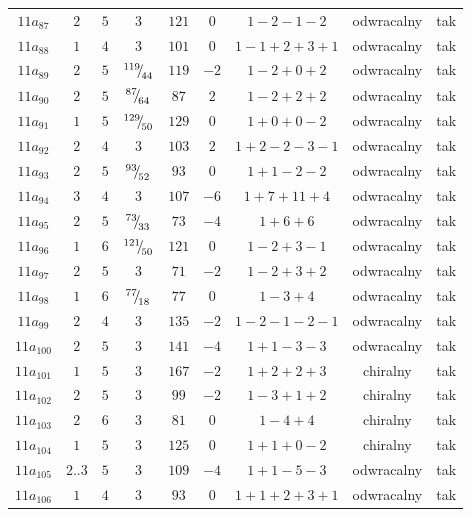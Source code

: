 \begin{longtable}{ccccccccc}
$11a_{87}$ & $2$ & $5$ & $3$ & $121$ & $0$ & $1-2-1-2$ & odwracalny & tak \\
$11a_{88}$ & $1$ & $4$ & $3$ & $101$ & $0$ & $1-1+2+3+1$ & odwracalny & tak \\
$11a_{89}$ & $2$ & $5$ & ${}^{119}{\mskip -5mu/\mskip -3mu}_{44}$ & $119$ & $-2$ & $1-2+0+2$ & odwracalny & tak \\
$11a_{90}$ & $2$ & $5$ & ${}^{87}{\mskip -5mu/\mskip -3mu}_{64}$ & $87$ & $2$ & $1-2+2+2$ & odwracalny & tak \\
$11a_{91}$ & $1$ & $5$ & ${}^{129}{\mskip -5mu/\mskip -3mu}_{50}$ & $129$ & $0$ & $1+0+0-2$ & odwracalny & tak \\
$11a_{92}$ & $2$ & $4$ & $3$ & $103$ & $2$ & $1+2-2-3-1$ & odwracalny & tak \\
$11a_{93}$ & $2$ & $5$ & ${}^{93}{\mskip -5mu/\mskip -3mu}_{52}$ & $93$ & $0$ & $1+1-2-2$ & odwracalny & tak \\
$11a_{94}$ & $3$ & $4$ & $3$ & $107$ & $-6$ & $1+7+11+4$ & odwracalny & tak \\
$11a_{95}$ & $2$ & $5$ & ${}^{73}{\mskip -5mu/\mskip -3mu}_{33}$ & $73$ & $-4$ & $1+6+6$ & odwracalny & tak \\
$11a_{96}$ & $1$ & $6$ & ${}^{121}{\mskip -5mu/\mskip -3mu}_{50}$ & $121$ & $0$ & $1-2+3-1$ & odwracalny & tak \\
$11a_{97}$ & $2$ & $5$ & $3$ & $71$ & $-2$ & $1-2+3+2$ & odwracalny & tak \\
$11a_{98}$ & $1$ & $6$ & ${}^{77}{\mskip -5mu/\mskip -3mu}_{18}$ & $77$ & $0$ & $1-3+4$ & odwracalny & tak \\
$11a_{99}$ & $2$ & $4$ & $3$ & $135$ & $-2$ & $1-2-1-2-1$ & odwracalny & tak \\
$11a_{100}$ & $2$ & $5$ & $3$ & $141$ & $-4$ & $1+1-3-3$ & odwracalny & tak \\
$11a_{101}$ & $1$ & $5$ & $3$ & $167$ & $-2$ & $1+2+2+3$ & chiralny & tak \\
$11a_{102}$ & $2$ & $5$ & $3$ & $99$ & $-2$ & $1-3+1+2$ & chiralny & tak \\
$11a_{103}$ & $2$ & $6$ & $3$ & $81$ & $0$ & $1-4+4$ & chiralny & tak \\
$11a_{104}$ & $1$ & $5$ & $3$ & $125$ & $0$ & $1+1+0-2$ & chiralny & tak \\
$11a_{105}$ & $2..3$ & $5$ & $3$ & $109$ & $-4$ & $1+1-5-3$ & odwracalny & tak \\
$11a_{106}$ & $1$ & $4$ & $3$ & $93$ & $0$ & $1+1+2+3+1$ & odwracalny & tak \\

\end{longtable}
